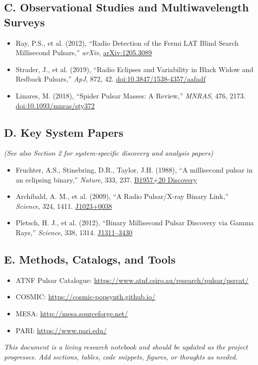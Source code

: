 \documentclass[12pt]{article}
\begin{document}
\subsection*{C. Observational Studies and Multiwavelength Surveys}
\begin{itemize}
    \item Ray, P.S., et al. (2012), ``Radio Detection of the Fermi LAT Blind Search Millisecond Pulsars,'' \textit{arXiv}, \href{https://arxiv.org/abs/1205.3089}{arXiv:1205.3089}
    \item Strader, J., et al. (2019), ``Radio Eclipses and Variability in Black Widow and Redback Pulsars,'' \textit{ApJ}, 872, 42. \href{https://iopscience.iop.org/article/10.3847/1538-4357/aafadf}{doi:10.3847/1538-4357/aafadf}
    \item Linares, M. (2018), ``Spider Pulsar Masses: A Review,'' \textit{MNRAS}, 476, 2173. \href{https://academic.oup.com/mnras/article/476/2/2173/4844415}{doi:10.1093/mnras/sty372}
\end{itemize}

\subsection*{D. Key System Papers}
\textit{(See also Section 2 for system-specific discovery and analysis papers)}
\begin{itemize}
    \item Fruchter, A.S., Stinebring, D.R., Taylor, J.H. (1988), ``A millisecond pulsar in an eclipsing binary,'' \textit{Nature}, 333, 237. \href{https://www.nature.com/articles/333237a0}{B1957+20 Discovery}
    \item Archibald, A. M., et al. (2009), ``A Radio Pulsar/X-ray Binary Link,'' \textit{Science}, 324, 1411. \href{https://www.science.org/doi/10.1126/science.1172740}{J1023+0038}
    \item Pletsch, H. J., et al. (2012), ``Binary Millisecond Pulsar Discovery via Gamma Rays,'' \textit{Science}, 338, 1314. \href{https://www.science.org/doi/10.1126/science.1229054}{J1311--3430}
\end{itemize}

\subsection*{E. Methods, Catalogs, and Tools}
\begin{itemize}
    \item ATNF Pulsar Catalogue: \href{https://www.atnf.csiro.au/research/pulsar/psrcat/}{https://www.atnf.csiro.au/research/pulsar/psrcat/}
    \item COSMIC: \href{https://cosmic-popsynth.github.io/}{https://cosmic-popsynth.github.io/}
    \item MESA: \href{http://mesa.sourceforge.net/}{http://mesa.sourceforge.net/}
    \item PARI: \href{https://www.pari.edu/}{https://www.pari.edu/}
\end{itemize}


\vspace{2em}
\noindent\textit{This document is a living research notebook and should be updated as the project progresses. Add sections, tables, code snippets, figures, or thoughts as needed.}
\end{document}
